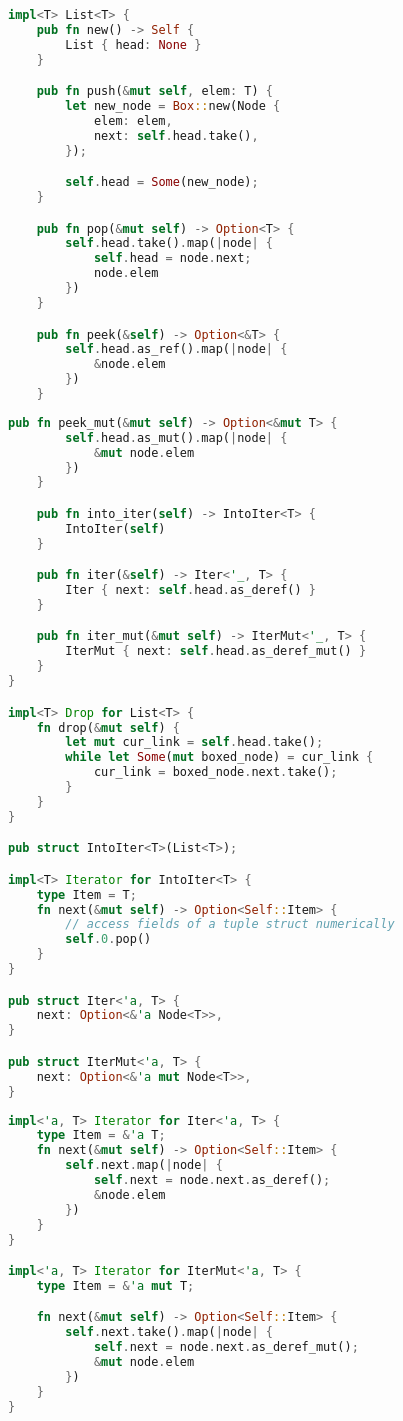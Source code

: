 \begin{lstlisting}[language=rust]
impl<T> List<T> {
    pub fn new() -> Self {
        List { head: None }
    }

    pub fn push(&mut self, elem: T) {
        let new_node = Box::new(Node {
            elem: elem,
            next: self.head.take(),
        });

        self.head = Some(new_node);
    }

    pub fn pop(&mut self) -> Option<T> {
        self.head.take().map(|node| {
            self.head = node.next;
            node.elem
        })
    }

    pub fn peek(&self) -> Option<&T> {
        self.head.as_ref().map(|node| {
            &node.elem
        })
    }
\end{lstlisting}
\pagebreak
\newpage
\begin{lstlisting}[language=rust]
    pub fn peek_mut(&mut self) -> Option<&mut T> {
        self.head.as_mut().map(|node| {
            &mut node.elem
        })
    }

    pub fn into_iter(self) -> IntoIter<T> {
        IntoIter(self)
    }

    pub fn iter(&self) -> Iter<'_, T> {
        Iter { next: self.head.as_deref() }
    }

    pub fn iter_mut(&mut self) -> IterMut<'_, T> {
        IterMut { next: self.head.as_deref_mut() }
    }
}

impl<T> Drop for List<T> {
    fn drop(&mut self) {
        let mut cur_link = self.head.take();
        while let Some(mut boxed_node) = cur_link {
            cur_link = boxed_node.next.take();
        }
    }
}

pub struct IntoIter<T>(List<T>);

impl<T> Iterator for IntoIter<T> {
    type Item = T;
    fn next(&mut self) -> Option<Self::Item> {
        // access fields of a tuple struct numerically
        self.0.pop()
    }
}

pub struct Iter<'a, T> {
    next: Option<&'a Node<T>>,
}

pub struct IterMut<'a, T> {
    next: Option<&'a mut Node<T>>,
}
\end{lstlisting}
\pagebreak
\newpage
\begin{lstlisting}[language=rust]
impl<'a, T> Iterator for Iter<'a, T> {
    type Item = &'a T;
    fn next(&mut self) -> Option<Self::Item> {
        self.next.map(|node| {
            self.next = node.next.as_deref();
            &node.elem
        })
    }
}

impl<'a, T> Iterator for IterMut<'a, T> {
    type Item = &'a mut T;

    fn next(&mut self) -> Option<Self::Item> {
        self.next.take().map(|node| {
            self.next = node.next.as_deref_mut();
            &mut node.elem
        })
    }
}
\end{lstlisting}

